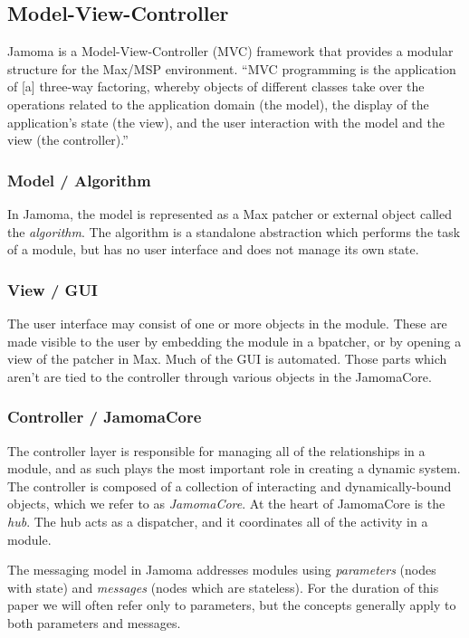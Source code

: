 \documentclass{article}
\begin{document}
\subsection{Model-View-Controller} %
\label{sec:mvc}

Jamoma is a Model-View-Controller (MVC) framework that provides a modular structure for the Max/MSP environment. ``MVC programming is the application of [a] three-way factoring, whereby objects of different classes take over the operations related to the application domain (the model), the display of the application's state (the view), and the user interaction with the model and the view (the controller).'' \cite{Krasner:1988}  

\subsubsection{Model / Algorithm} %
In Jamoma, the model is represented as a Max patcher or external object called the \emph{algorithm}. The algorithm is a standalone abstraction which performs the task of a module, but has no user interface and does not manage its own state.

\subsubsection{View / GUI} %
The user interface may consist of one or more objects in the module. These are made visible to the user by embedding the module in a bpatcher, or by opening a view of the patcher in Max. Much of the GUI is automated. Those parts which aren't are tied to the controller through various objects in the JamomaCore.

\subsubsection{Controller / JamomaCore} %
The controller layer is responsible for managing all of the relationships in a module, and as such plays the most important role in creating a dynamic system.  
The controller is composed of a collection of interacting and dynamically-bound objects, which we refer to as \emph{JamomaCore}. At the heart of JamomaCore is the \emph{hub}. The hub acts as a dispatcher, and it coordinates all of the activity in a module. 

The messaging model in Jamoma addresses modules using \emph{parameters} (nodes with state) and \emph{messages} (nodes which are stateless). For the duration of this paper we will often refer only to parameters, but the concepts generally apply to both parameters and messages.
\end{document}
